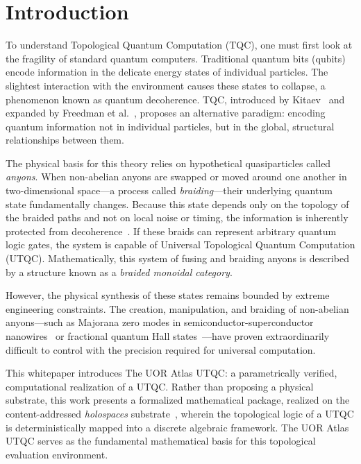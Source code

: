 \section{Introduction}

To understand Topological Quantum Computation (TQC), one must first look at the fragility of standard quantum computers. Traditional quantum bits (qubits) encode information in the delicate energy states of individual particles. The slightest interaction with the environment causes these states to collapse, a phenomenon known as quantum decoherence. TQC, introduced by Kitaev~\cite{kitaev2003} and expanded by Freedman et al.\ \cite{freedman2003}, proposes an alternative paradigm: encoding quantum information not in individual particles, but in the global, structural relationships between them.

The physical basis for this theory relies on hypothetical quasiparticles called \textit{anyons}. When non-abelian anyons are swapped or moved around one another in two-dimensional space—a process called \textit{braiding}—their underlying quantum state fundamentally changes. Because this state depends only on the topology of the braided paths and not on local noise or timing, the information is inherently protected from decoherence~\cite{nayak2008}. If these braids can represent arbitrary quantum logic gates, the system is capable of Universal Topological Quantum Computation (UTQC). Mathematically, this system of fusing and braiding anyons is described by a structure known as a \textit{braided monoidal category}.

However, the physical synthesis of these states remains bounded by extreme engineering constraints. The creation, manipulation, and braiding of non-abelian anyons---such as Majorana zero modes in semiconductor-superconductor nanowires~\cite{alicea2012} or fractional quantum Hall states~\cite{moore1991}---have proven extraordinarily difficult to control with the precision required for universal computation.

This whitepaper introduces The UOR Atlas UTQC\@: a parametrically verified, computational realization of a UTQC\@. Rather than proposing a physical substrate, this work presents a formalized mathematical package, realized on the content-addressed \textit{holospaces} substrate~\cite{holospaces}, wherein the topological logic of a UTQC is deterministically mapped into a discrete algebraic framework. The UOR Atlas UTQC serves as the fundamental mathematical basis for this topological evaluation environment.

